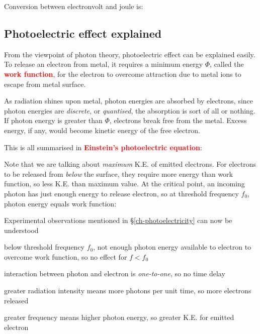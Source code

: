 \documentclass[a4paper,12pt]{book}
\newcommand{\keypoint}[1]{\textbf{\textcolor{red}{#1}}}
\newcommand{\tmax}{\text{max}}
\newcommand{\tcbhighmath}[1]{\boxed{#1}}
\newcommand{\keypoint}[1]{\textbf{\textcolor{red}{#1}}}
\begin{document}
Conversion between electronvolt and joule is: 

\label{ex-redlaser}

\subsection{Photoelectric effect explained}

From the viewpoint of photon theory, photoelectric effect can be explained easily. To release an electron from metal, it requires a minimum energy $\Phi$, called the \keypoint{work function}, for the electron to overcome attraction due to metal ions to escape from metal surface. 

As radiation shines upon metal, photon energies are absorbed by electrons, since photon energies are \emph{discrete}, or \emph{quantised}, the absorption is sort of all or nothing. If photon energy is greater than $\Phi$, electrons break free from the metal. Excess energy, if any, would become kinetic energy of the free electron.

This is all summarised in \keypoint{Einstein's photoelectric equation}: 

Note that we are talking about \emph{maximum} K.E. of emitted electrons. For electrons to be released from \emph{below} the surface, they require more energy than work function, so less K.E. than maximum value. At the critical point, an incoming photon has just enough energy to release electron, so at threshold frequency $f_0$, photon energy equals work function: 

Experimental observations mentioned in \S\ref{ch-photoelectricity} can now be understood

\begin{compactitem}
	
	\item[--] below threshold frequency $f_0$, not enough photon energy available to electron to overcome work function, so no effect for $f<f_0$
	
	\item[--] interaction between photon and electron is \emph{one-to-one}, so no time delay
	
	\item[--] greater radiation intensity means more photons per unit time, so more electrons released
	
	\item[--] greater frequency means higher photon energy, so greater K.E. for emitted electron
	
\end{compactitem}
\end{document}
